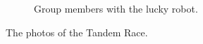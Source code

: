 \documentclass[10pt,conference,compsocconf]{IEEEtran}
\begin{document}
\begin{appendices}
\begin{figure}[!ht]
\begin{subfigure}{0.4\textwidth}
    \caption{Group members with the lucky robot.}
  \end{subfigure}
  \caption{The photos of the Tandem Race.}
\end{figure}

\end{appendices}
\end{document}
